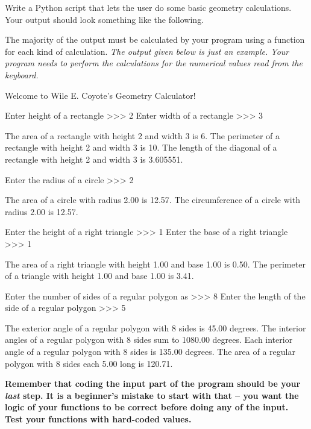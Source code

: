 \documentclass[11pt]{cselabheader}
\begin{document}
\begin{ex}
  Write a Python script that lets the user do some basic
  geometry calculations. Your output should look something like the following.

  The majority of the output must be calculated by your program using a function
  for each kind of calculation. \emph{The output given below is just an example.
  Your program needs to perform the calculations for the numerical values read
  from the keyboard.}

  \begin{verbatimcode}
Welcome to Wile E. Coyote's Geometry Calculator!

Enter height of a rectangle >>> 2
Enter width of a rectangle >>> 3

The area of a rectangle with height 2 and width 3 is 6.
The perimeter of a rectangle with height 2 and width 3 is 10.
The length of the diagonal of a rectangle with height 2 and width 3 is 3.605551.

Enter the radius of a circle >>> 2

The area of a circle with radius 2.00 is 12.57.
The circumference of a circle with radius 2.00 is 12.57.

Enter the height of a right triangle >>> 1
Enter the base of a right triangle >>> 1

The area of a right triangle with height 1.00 and base 1.00 is 0.50.
The perimeter of a triangle with height 1.00 and base 1.00 is 3.41.

Enter the number of sides of a regular polygon as >>> 8
Enter the length of the side of a regular polygon >>> 5

The exterior angle of a regular polygon with 8 sides is 45.00 degrees.
The interior angles of a regular polygon with 8 sides sum to 1080.00 degrees.
Each interior angle of a regular polygon with 8 sides is 135.00 degrees.
The area of a regular polygon with 8 sides each 5.00 long is 120.71.
  \end{verbatimcode}

  \begin{center}
    \bfseries Remember that coding the input part of the program should be your
    \emph{last} step. It is a beginner's mistake to start with that -- you want
    the logic of your functions to be correct before doing any of the input.
    Test your functions with hard-coded values.
  \end{center}


\end{ex}
\end{document}
